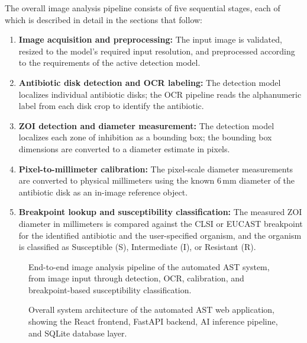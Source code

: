 The overall image analysis pipeline consists of five sequential stages, each of which is
described in detail in the sections that follow:
\begin{enumerate}
  \item \textbf{Image acquisition and preprocessing:} The input image is validated, resized to
        the model's required input resolution, and preprocessed according to the requirements
        of the active detection model.
  \item \textbf{Antibiotic disk detection and OCR labeling:} The detection model localizes
        individual antibiotic disks; the OCR pipeline reads the alphanumeric label from each
        disk crop to identify the antibiotic.
  \item \textbf{ZOI detection and diameter measurement:} The detection model localizes each
        zone of inhibition as a bounding box; the bounding box dimensions are converted to a
        diameter estimate in pixels.
  \item \textbf{Pixel-to-millimeter calibration:} The pixel-scale diameter measurements are
        converted to physical millimeters using the known 6\,mm diameter of the antibiotic
        disk as an in-image reference object.
  \item \textbf{Breakpoint lookup and susceptibility classification:} The measured ZOI diameter
        in millimeters is compared against the CLSI or EUCAST breakpoint for the identified
        antibiotic and the user-specified organism, and the organism is classified as
        Susceptible (S), Intermediate (I), or Resistant (R).
\end{enumerate}

\begin{figure}[H]
  \centering
  \caption{End-to-end image analysis pipeline of the automated AST system, from image input
    through detection, OCR, calibration, and breakpoint-based susceptibility classification.}
  \label{fig:pipeline}
\end{figure}

\begin{figure}[H]
  \centering
  \caption{Overall system architecture of the automated AST web application, showing the
    React frontend, FastAPI backend, AI inference pipeline, and SQLite database layer.}
  \label{fig:sys_arch}
\end{figure}

